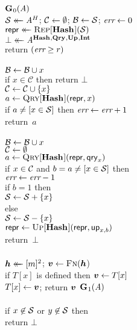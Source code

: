 \begin{figure}
  {
    \underline{$\mathbf{G}\hspace{0.5pt}_0(\mathit{A})$}\\[2pt]
      $\mathcal{S} \mathrel{\leftarrow\mkern-14mu\leftarrow} \mathit{A}^H$; $\mathcal{C} \gets \emptyset$; $\mathcal{B} \gets \mathcal{S}$; $\textit{err} \gets 0$\\
      $\mathsf{repr} \mathrel{\leftarrow\mkern-14mu\leftarrow} \textsc{Rep}[\mathbf{Hash}\hspace{0.5pt}](\mathcal{S})$\\
      $\bot \mathrel{\leftarrow\mkern-14mu\leftarrow} \mathit{A}^{\mathbf{Hash}\hspace{0.5pt},\mathbf{Qry}\hspace{0.5pt},\mathbf{Up}\hspace{0.5pt},\mathbf{Int}\hspace{0.5pt}}$\\
      return $(\textit{err} \geq r)$
    \\[6pt]
    \\[2pt]
      $\mathcal{B} \gets \mathcal{B} \cup x$\\
      if $x \in \mathcal{C}$ then return $\bot$\\
      $\mathcal{C} \gets \mathcal{C} \cup \{x\}$\\
      $a \gets \textsc{Qry}[\mathbf{Hash}\hspace{0.5pt}](\mathsf{repr}, x)$\\
      if $a \neq [x \in \mathcal{S}]$ then $\textit{err} \gets \textit{err} + 1$\\
      return~$a$
    \\[6pt]
    \\[2pt]
      $\mathcal{B} \gets \mathcal{B} \cup x$\\
      $\mathcal{C} \gets \emptyset$\\
      $a \gets \textsc{Qry}[\mathbf{Hash}\hspace{0.5pt}](\mathsf{repr}, \mathsf{qry}_x)$\\
      if $x \in \mathcal{C}$ and $b = a \neq [x \in \mathcal{S}]$ then\\
      \tab $\textit{err} \gets \textit{err}-1$\\
      if $b = 1$ then\\
      \tab $\mathcal{S} \gets \mathcal{S} + \{x\}$\\
      else\\
      \tab $\mathcal{S} \gets \mathcal{S} - \{x\}$\\
      $\mathsf{repr} \gets \textsc{Up}[\mathbf{Hash}\hspace{0.5pt}](\mathsf{repr},\mathsf{up}_{x,b})$\\
      return~$\bot$
    \\[6pt]
    \\
      $\hh \getsr [m]^2$; $\vv \gets \fff(\hh$)\\
      if $T[x]$ is defined then $\vv \gets T[x]$\\
      $T[x] \gets \vv$;
      return $\vv$
  }
  {
    \underline{$\mathbf{G}\hspace{0.5pt}_1(\mathit{A})$}\\[2pt]
    \\
      if $x \not\in \mathcal{S}$ or $y \not\in \mathcal{S}$ then\\
      \tab return $\bot$\\
}
\end{figure}
